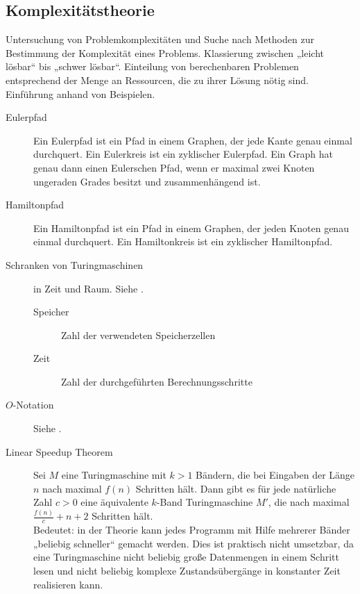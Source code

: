 \subsection{Komplexitätstheorie}
    Untersuchung von Problemkomplexitäten und Suche nach Methoden zur Bestimmung der Komplexität eines Problems. Klassierung zwischen „leicht lösbar“ bis „schwer lösbar“. Einteilung von berechenbaren Problemen entsprechend der Menge an Ressourcen, die zu ihrer Lösung nötig sind. Einführung anhand von Beispielen. 
    \begin{description}
        \item[Eulerpfad] Ein Eulerpfad ist ein Pfad in einem Graphen, der jede Kante genau einmal durchquert. Ein Eulerkreis ist ein zyklischer Eulerpfad. Ein Graph hat genau dann einen Eulerschen Pfad, wenn er maximal zwei Knoten ungeraden Grades besitzt und zusammenhängend ist.
        \item[Hamiltonpfad] Ein Hamiltonpfad ist ein Pfad in einem Graphen, der jeden Knoten genau einmal durchquert. Ein Hamiltonkreis ist ein zyklischer Hamiltonpfad.

        \item[Schranken von Turingmaschinen] in Zeit und Raum. Siehe .
            \begin{description}
                \item[Speicher] Zahl der verwendeten Speicherzellen
                \item[Zeit] Zahl der durchgeführten Berechnungsschritte
            \end{description}

        \item[$O$-Notation] Siehe .
        \item[Linear Speedup Theorem] Sei $M$ eine Turingmaschine mit $k > 1$ Bändern, die bei Eingaben der Länge $n$ nach maximal $f(n)$ Schritten hält. Dann gibt es für jede natürliche Zahl $c > 0$ eine äquivalente $k$-Band Turingmaschine $M'$, die nach maximal $\frac{f(n)}{c} + n + 2$ Schritten hält. \\
        Bedeutet: in der Theorie kann jedes Programm mit Hilfe mehrerer Bänder „beliebig schneller“ gemacht werden. Dies ist praktisch nicht umsetzbar, da eine Turingmaschine nicht beliebig große Datenmengen in einem Schritt lesen und nicht beliebig komplexe Zustandsübergänge in konstanter Zeit realisieren kann.
    \end{description}

